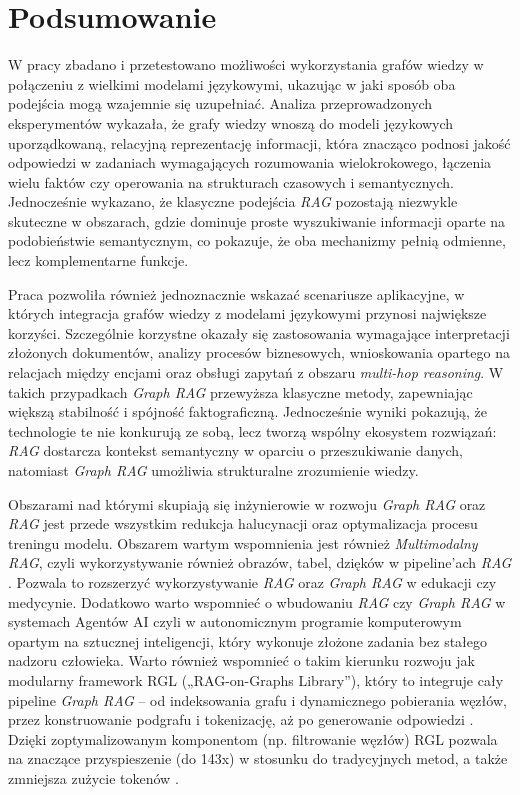 \documentclass[
a4paper,
12pt,
]{article}
\begin{document}
\section{Podsumowanie}
W pracy zbadano i przetestowano możliwości wykorzystania grafów wiedzy w połączeniu z wielkimi modelami językowymi, ukazując w jaki sposób oba podejścia mogą wzajemnie się uzupełniać. Analiza przeprowadzonych eksperymentów wykazała, że grafy wiedzy wnoszą do modeli językowych uporządkowaną, relacyjną reprezentację informacji, która znacząco podnosi jakość odpowiedzi w zadaniach wymagających rozumowania wielokrokowego, łączenia wielu faktów czy operowania na strukturach czasowych i semantycznych. Jednocześnie wykazano, że klasyczne podejścia \textit{RAG} pozostają niezwykle skuteczne w obszarach, gdzie dominuje proste wyszukiwanie informacji oparte na podobieństwie semantycznym, co pokazuje, że oba mechanizmy pełnią odmienne, lecz komplementarne funkcje.

Praca pozwoliła również jednoznacznie wskazać scenariusze aplikacyjne, w których integracja grafów wiedzy z modelami językowymi przynosi największe korzyści. Szczególnie korzystne okazały się zastosowania wymagające interpretacji złożonych dokumentów, analizy procesów biznesowych, wnioskowania opartego na relacjach między encjami oraz obsługi zapytań z obszaru \textit{multi-hop reasoning}. W takich przypadkach \textit{Graph RAG} przewyższa klasyczne metody, zapewniając większą stabilność i spójność faktograficzną. Jednocześnie wyniki pokazują, że technologie te nie konkurują ze sobą, lecz tworzą wspólny ekosystem rozwiązań:\textit{ RAG }dostarcza kontekst semantyczny w oparciu o przeszukiwanie danych, natomiast \textit{Graph RAG} umożliwia strukturalne zrozumienie wiedzy.

Obszarami nad którymi skupiają się inżynierowie w rozwoju \textit{Graph RAG} oraz \textit{RAG} jest przede wszystkim redukcja halucynacji oraz optymalizacja procesu treningu modelu. Obszarem wartym wspomnienia jest również \textit{Multimodalny RAG}, czyli wykorzystywanie również obrazów, tabel, dzięków w pipeline’ach \textit{RAG} \cite{dataworkz}.  Pozwala to rozszerzyć wykorzystywanie \textit{RAG }oraz \textit{Graph RAG} w edukacji czy medycynie. Dodatkowo warto wspomnieć o wbudowaniu \textit{RAG}  czy \textit{Graph RAG} w systemach Agentów AI  czyli w autonomicznym programie komputerowym opartym na sztucznej inteligencji, który wykonuje złożone zadania bez stałego nadzoru człowieka.  Warto również wspomnieć o takim kierunku  rozwoju jak modularny framework RGL („RAG-on-Graphs Library”), który to  integruje cały pipeline \textit{Graph RAG} -- od indeksowania grafu i dynamicznego pobierania węzłów, przez konstruowanie podgrafu i tokenizację, aż po generowanie odpowiedzi \cite{ RGL}. Dzięki zoptymalizowanym komponentom (np. filtrowanie węzłów) RGL pozwala na znaczące przyspieszenie (do 143x) w stosunku do tradycyjnych metod, a także zmniejsza zużycie tokenów \cite{RGL}.
\end{document}
